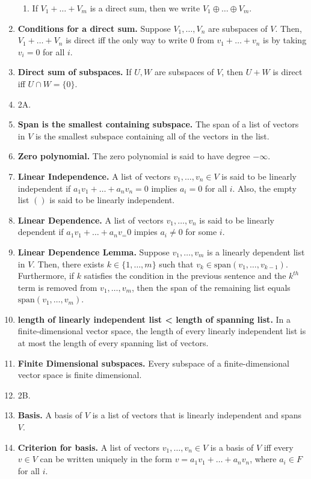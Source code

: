 \begin{enumerate}
\begin{enumerate}
		\item If $V_1 + \dots + V_m$ is a direct sum, then we write $V_1 \oplus \dots \oplus V_m$. 
	\end{enumerate}
	\item \textbf{Conditions for a direct sum. } Suppose $V_1,\dots,V_n$ are subspaces of $V$. Then, $V_1 + \dots + V_n$ is direct iff the only way to write 0 from $v_1 + \dots + v_n$ is by taking $v_i=0$ for all $i$. 
	\item \textbf{Direct sum of subspaces. } If $U,W$ are subspaces of $V$, then $U + W$ is direct iff $U \cap W = \{0\}$. 	
	\item 2A. 
	\item \textbf{Span is the smallest containing subspace. } The span of a list of vectors in $V$ is the smallest subspace containing all of the vectors in the list. 
	\item \textbf{Zero polynomial. } The zero polynomial is said to have degree $-\infty$. 
	\item \textbf{Linear Independence. } A list of vectors $v_1,\dots,v_n \in V$ is said to be linearly independent if $a_1v_1 + \dots + a_nv_n = 0$ implies $a_i=0$ for all $i$. Also, the empty list $()$ is said to be linearly independent. 
	\item \textbf{Linear Dependence. } A list of vectors $v_1,\dots,v_n$ is said to be linearly dependent if $a_1v_1 + \dots + a_nv_=0$ impies $a_i \neq 0$ for some $i$. 
	\item \textbf{Linear Dependence Lemma. } Suppose $v_1,\dots,v_m$ is a linearly dependent list in $V$. Then, there exists $k \in \{1,\dots,m\}$ such that $v_k \in \textrm{span}(v_1,\dots,v_{k-1})$. Furthermore, if $k$ satisfies the condition in the previous sentence and the $k^{th}$ term is removed from $v_1,\dots,v_m$, then the span of the remaining list equals $\textrm{span}(v_1,\dots,v_m)$. 
	\item \textbf{length of linearly independent list < length of spanning list. } In a finite-dimensional vector space, the length of every linearly independent list is at most the length of every spanning list of vectors. 
	\item \textbf{Finite Dimensional subspaces. } Every subspace of a finite-dimensional vector space is finite dimensional. 
	\item 2B. 
	\item \textbf{Basis. } A basis of $V$ is a list of vectors that is linearly independent and spans $V$. 
	\item \textbf{Criterion for basis. } A list of vectors $v_1,\dots,v_n \in V$ is a basis of $V$ iff every $v \in V$ can be written uniquely in the form $v=a_1v_1 + \dots + a_nv_n$, where $a_i \in F$ for all $i$. 

\end{enumerate}
